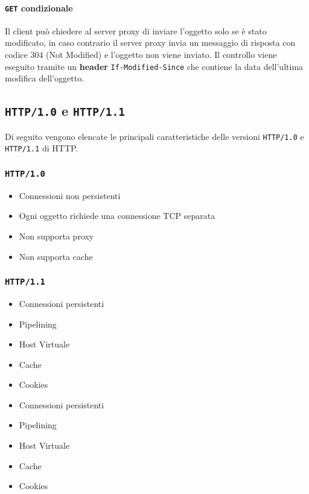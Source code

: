         \paragraph{\texttt{GET} condizionale} Il client può chiedere al server proxy di inviare l'oggetto solo se è stato modificato, in caso contrario il server proxy invia un messaggio di risposta con codice 304 (Not Modified) e l'oggetto non viene inviato. Il controllo viene eseguito tramite un \textbf{header} \texttt{If-Modified-Since} che contiene la data dell'ultima modifica dell'oggetto.
    \subsection{\texttt{HTTP/1.0} e \texttt{HTTP/1.1}}
        Di seguito vengono elencate le principali caratteristiche delle versioni \texttt{HTTP/1.0} e \texttt{HTTP/1.1} di \Acrshort*{HTTP}.
        \subsubsection{\texttt{HTTP/1.0}}
            \begin{itemize}
                \item Connessioni non persistenti
                \item Ogni oggetto richiede una connessione TCP separata
                \item Non supporta proxy
                \item Non supporta cache
            \end{itemize}
        \subsubsection{\texttt{HTTP/1.1}}
            \begin{itemize}
                \item Connessioni persistenti
                \item Pipelining
                \item Host Virtuale
                \item Cache
                \item Cookies
                \item Connessioni persistenti
                \item Pipelining
                \item Host Virtuale
                \item Cache
                \item Cookies
            \end{itemize}
